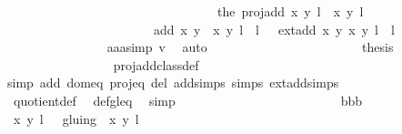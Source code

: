 \begin{isabellebody}
\ \ \ \ \ \ \ \ \ \ \ \ \ \ \ \ \ \ \ \ \ \ \ \ \ \ \ \ \ \ \ \ \ the\ {\isacharparenleft}proj{\isacharunderscore}add\ {\isacharparenleft}{\isacharparenleft}x{\isacharcomma}\ y{\isacharparenright}{\isacharcomma}\ l{\isacharparenright}\ {\isacharparenleft}{\isasymtau}\ {\isacharparenleft}x{\isacharprime}{\isacharcomma}\ y{\isacharprime}{\isacharparenright}{\isacharcomma}\ l{\isacharprime}\ {\isacharplus}\ {}{\isacharparenright}{\isacharparenright}{\isacharbraceright}\ {\isacharequal}\isanewline
\ \ \ \ \ \ \ \ \ \ \ \ \ \ \ \ \ \ \ \ \ \ \ {\isacharbraceleft}{\isacharparenleft}add\ {\isacharparenleft}x{\isacharcomma}\ y{\isacharparenright}\ {\isacharparenleft}{\isasymtau}\ {\isacharparenleft}x{\isacharprime}{\isacharcomma}\ y{\isacharprime}{\isacharparenright}{\isacharparenright}{\isacharcomma}\ l\ {\isacharplus}\ l{\isacharprime}\ {\isacharplus}\ {}{\isacharparenright}{\isacharcomma}\ {\isacharparenleft}ext{\isacharunderscore}add\ {\isacharparenleft}x{\isacharcomma}\ y{\isacharparenright}\ {\isacharparenleft}x{\isacharprime}{\isacharcomma}\ y{\isacharprime}{\isacharparenright}{\isacharcomma}\ l\ {\isacharplus}\ l{\isacharprime}{\isacharparenright}{\isacharbraceright}{\isachardoublequoteclose}\isanewline
\ \ \ \ \ \ \ \ \ \ \ \ \ \ \isamarkupfalse%
\ aaa{\isacharunderscore}simp\ v{}\ \isamarkupfalse%
\ auto\ \ \ \ \ \ \ \ \ \ \isanewline
\ \ \ \ \ \ \ \ \ \ \ \ \isamarkupfalse%
\ {\isacharquery}thesis\isanewline
\ \ \ \ \ \ \ \ \ \ \ \ \ \ \isamarkupfalse%
\ {}\ proj{\isacharunderscore}add{\isacharunderscore}class{\isacharunderscore}def\ \isamarkupfalse%
{\isacharparenleft}simp\ add{\isacharcolon}\ dom{\isacharunderscore}eq\ proj{\isacharunderscore}eq\ del{\isacharcolon}\ add{\isachardot}simps\ {\isasymtau}{\isachardot}simps\ ext{\isacharunderscore}add{\isachardot}simps{\isacharparenright}\isanewline
\ \ \ \ \ \ \ \ \ \ \ \ \ \ \isamarkupfalse%
\ quotient{\isacharunderscore}def\ \isamarkupfalse%
\ def{\isacharunderscore}gl{\isacharunderscore}eq\ \isamarkupfalse%
\ simp\ \isanewline
\ \ \ \ \ \ \ \ \ \ \isamarkupfalse%
\isanewline
\ \ \ \ \ \ \ \ \ \ \ \ \isamarkupfalse%
\ bbb\isanewline
\ \ \ \ \ \ \ \ \ \ \ \ \isamarkupfalse%
\ {\isachardoublequoteopen}{\isacharbraceleft}{\isacharparenleft}{\isacharparenleft}x{\isacharcomma}\ y{\isacharparenright}{\isacharcomma}\ l{\isacharparenright}{\isacharbraceright}\ \ {\isacharslash}{\isacharslash}\ gluing\ {\isacharequal}\ {\isacharbraceleft}{\isacharbraceleft}{\isacharparenleft}{\isacharparenleft}x{\isacharcomma}\ y{\isacharparenright}{\isacharcomma}\ l{\isacharparenright}{\isacharbraceright}\ {\isacharbraceright}{\isachardoublequoteclose}\isanewline

\end{isabellebody}
